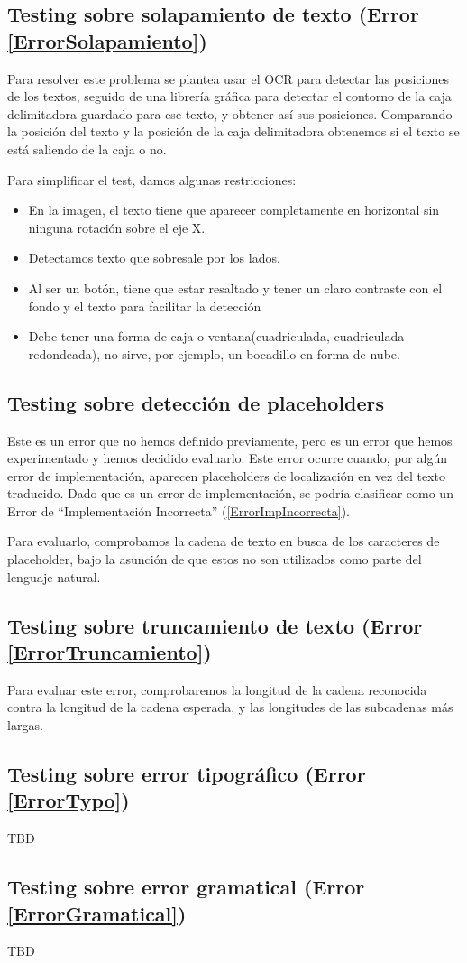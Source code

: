 \subsection{Testing sobre solapamiento de texto (Error \ref{ErrorSolapamiento})}
Para resolver este problema se plantea usar el OCR para detectar las posiciones de los textos, seguido de una librería gráfica para detectar el contorno de la caja delimitadora guardado para ese texto, y obtener así sus posiciones. Comparando la posición del texto y la posición de la caja delimitadora obtenemos si el texto se está saliendo de la caja o no.
	
Para simplificar el test, damos algunas restricciones: 
\begin{itemize}
	\item En la imagen, el texto tiene que aparecer completamente en horizontal sin ninguna rotación sobre el eje X.
	\item Detectamos texto que sobresale por los lados.
	\item Al ser un botón, tiene que estar resaltado y tener un claro contraste con el fondo y el texto para facilitar la detección
	\item Debe tener una forma de caja o ventana(cuadriculada, cuadriculada redondeada), no sirve, por ejemplo, un bocadillo en forma de nube.
\end{itemize} 
	
\subsection{Testing sobre detección de placeholders}
Este es un error que no hemos definido previamente, pero es un error que hemos experimentado y hemos decidido evaluarlo. Este error ocurre cuando, por algún error de implementación, aparecen placeholders de localización en vez del texto traducido. Dado que es un error de implementación, se podría clasificar como un Error de ``Implementación Incorrecta'' (\ref{ErrorImpIncorrecta}).

Para evaluarlo, comprobamos la cadena de texto en busca de los caracteres de placeholder, bajo la asunción de que estos no son utilizados como parte del lenguaje natural.

\subsection{Testing sobre truncamiento de texto (Error \ref{ErrorTruncamiento})}
Para evaluar este error, comprobaremos la longitud de la cadena reconocida contra la longitud de la cadena esperada, y las longitudes de las subcadenas más largas. 

\subsection{Testing sobre error tipográfico (Error \ref{ErrorTypo})}
TBD

\subsection{Testing sobre error gramatical (Error \ref{ErrorGramatical})}
TBD
 

